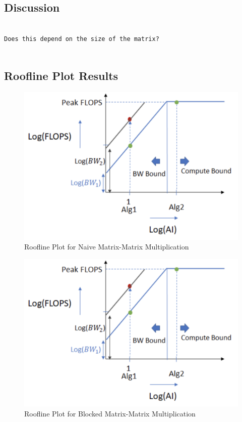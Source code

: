 \documentclass{article}
\begin{document}
\subsection{Discussion}

\begin{verbatim}

Does this depend on the size of the matrix?
    
\end{verbatim}

\subsection{Roofline Plot Results}
\begin{figure}[!htb]
    \centering
    \includegraphics[width=0.8\linewidth]{roofline_plot.png}
    \caption{Roofline Plot for Naive Matrix-Matrix Multiplication}
\end{figure}

\begin{figure}[!htb]
    \centering
    \includegraphics[width=0.8\linewidth]{roofline_plot.png}
    \caption{Roofline Plot for Blocked Matrix-Matrix Multiplication}
\end{figure}
\end{document}
